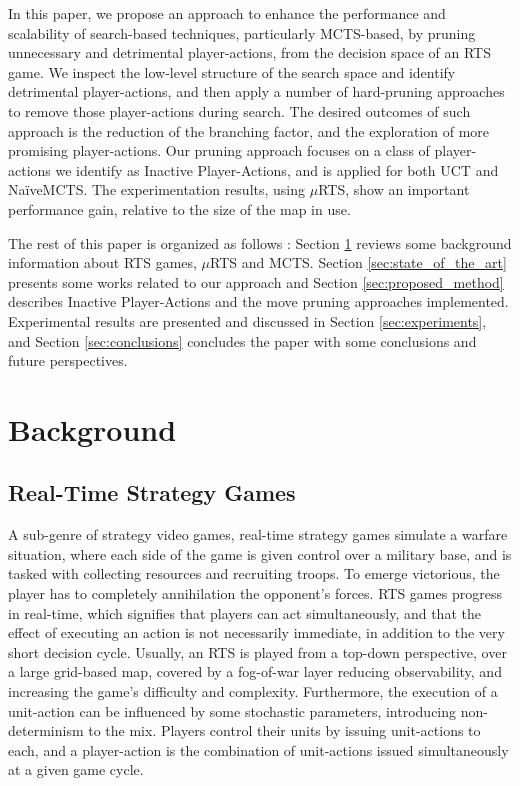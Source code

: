 \documentclass[conference]{IEEEtran}
\newcommand{\mRTS}{$\mu$RTS}
\begin{document}
In this paper, we propose an approach to enhance the performance and scalability of search-based techniques, particularly MCTS-based, by pruning unnecessary and detrimental player-actions, from the decision space of an RTS game. We inspect the low-level structure of the search space and identify detrimental player-actions, and then apply a number of hard-pruning approaches to remove those player-actions during search. The desired outcomes of such approach is the reduction of the branching factor, and the exploration of more promising player-actions. Our pruning approach focuses on a class of player-actions we identify as Inactive Player-Actions, and is applied for both UCT and NaïveMCTS. The experimentation results, using \mRTS{}, show an important performance gain, relative to the size of the map in use.

The rest of this paper is organized as follows : Section \ref{sec:background} reviews some background information about RTS games, \mRTS{} and MCTS. Section \ref{sec:state_of_the_art} presents some works related to our approach and Section \ref{sec:proposed_method} describes Inactive Player-Actions and the move pruning approaches implemented. Experimental results are presented and discussed in Section \ref{sec:experiments}, and Section \ref{sec:conclusions} concludes the paper with some conclusions and future perspectives.


\section{Background}
\label{sec:background}

\subsection{Real-Time Strategy Games}

A sub-genre of strategy video games, real-time strategy games simulate a warfare situation, where each side of the game is given control over a military base, and is tasked with collecting resources and recruiting troops. To emerge victorious, the player has to completely annihilation the opponent's forces. RTS games progress in real-time, which signifies that players can act simultaneously, and that the effect of executing an action is not necessarily immediate, in addition to the very short decision cycle. Usually, an RTS is played from a top-down perspective, over a large grid-based map, covered by a fog-of-war layer reducing observability, and increasing the game's difficulty and complexity. Furthermore, the execution of a unit-action can be influenced by some stochastic parameters, introducing non-determinism to the mix. Players control their units by issuing unit-actions to each, and a player-action is the combination of unit-actions issued simultaneously at a given game cycle.
\end{document}
